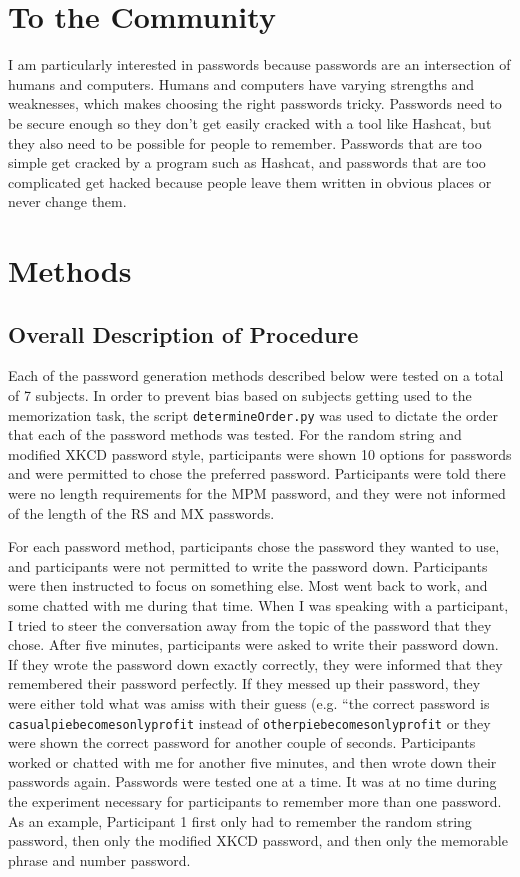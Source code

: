 \documentclass{article}
\begin{document}
\section*{To the Community}
I am particularly interested in passwords because passwords are an intersection of humans and computers. Humans and computers have varying strengths and weaknesses, which makes choosing the right passwords tricky. Passwords need to be secure enough so they don't get easily cracked with a tool like Hashcat, but they also need to be possible for people to remember. Passwords that are too simple get cracked by a program such as Hashcat, and passwords that are too complicated get hacked because people leave them written in obvious places or never change them.

\section*{Methods}
\subsection*{Overall Description of Procedure}
Each of the password generation methods described below were tested on a total of 7 subjects. In order to prevent bias based on subjects getting used to the memorization task, the script \texttt{determineOrder.py} was used to dictate the order that each of the password methods was tested. For the random string and modified XKCD password style, participants were shown 10 options for passwords and were permitted to chose the preferred password. Participants were told there were no length requirements for the MPM password, and they were not informed of the length of the RS and MX passwords.

For each password method, participants chose the password they wanted to use, and participants were not permitted to write the password down. Participants were then instructed to focus on something else. Most went back to work, and some chatted with me during that time. When I was speaking with a participant, I tried to steer the conversation away from the topic of the password that they chose. After five minutes, participants were asked to write their password down. If they wrote the password down exactly correctly, they were informed that they remembered their password perfectly. If they messed up their password, they were either told what was amiss with their guess (e.g. ``the correct password is \texttt{casualpiebecomesonlyprofit} instead of \texttt{otherpiebecomesonlyprofit} or they were shown the correct password for another couple of seconds. Participants worked or chatted with me for another five minutes, and then wrote down their passwords again. Passwords were tested one at a time. It was at no time during the experiment necessary for participants to remember more than one password. As an example, Participant 1 first only had to remember the random string password, then only the modified XKCD password, and then only the memorable phrase and number password.
\end{document}
